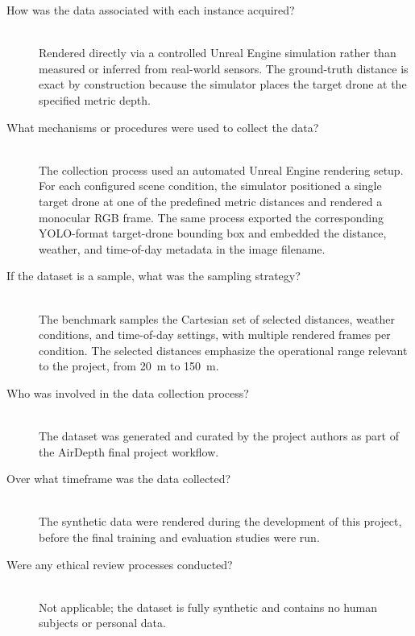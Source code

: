 \begin{description}
    \item[How was the data associated with each instance acquired?] \hfill \\{}
    Rendered directly via a controlled Unreal Engine simulation rather than
    measured or inferred from real-world sensors. The ground-truth distance is
    exact by construction because the simulator places the target drone at the
    specified metric depth.

    \item[What mechanisms or procedures were used to collect the data?] \hfill \\{}
    The collection process used an automated Unreal Engine rendering setup. For
    each configured scene condition, the simulator positioned a single target
    drone at one of the predefined metric distances and rendered a monocular
    \ac{RGB} frame. The same process exported the corresponding YOLO-format
    target-drone bounding box and embedded the distance, weather, and
    time-of-day metadata in the image filename.

    \item[If the dataset is a sample, what was the sampling strategy?] \hfill \\{}
    The benchmark samples the Cartesian set of selected distances, weather
    conditions, and time-of-day settings, with multiple rendered frames per
    condition. The selected distances emphasize the operational range relevant
    to the project, from 20~m to 150~m.

    \item[Who was involved in the data collection process?] \hfill \\{}
    The dataset was generated and curated by the project authors as part of the
    AirDepth final project workflow.

    \item[Over what timeframe was the data collected?] \hfill \\{}
    The synthetic data were rendered during the development of this project,
    before the final training and evaluation studies were run.

    \item[Were any ethical review processes conducted?] \hfill \\{}
    Not applicable; the dataset is fully synthetic and contains no human
    subjects or personal data.
\end{description}

